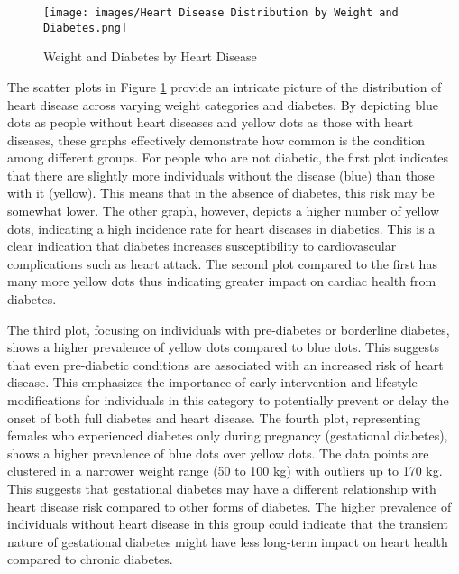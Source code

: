 \documentclass[12pt, a4paper,twoside]{report}
\numberwithin{equation}{chapter}
\begin{document}
 \begin{figure}[h]
     \centering
     \texttt{[image: images/Heart Disease Distribution by Weight and Diabetes.png]}
     \caption{Weight and Diabetes by Heart Disease}
     \label{fig:weight-diabetes}
 \end{figure}

The scatter plots in Figure \ref{fig:weight-diabetes} provide an intricate picture of the distribution of heart disease across varying weight categories and diabetes. By depicting blue dots as people without heart diseases and yellow dots as those with heart diseases, these graphs effectively demonstrate how common is the condition among different groups.
For people who are not diabetic, the first plot indicates that there are slightly more individuals without the disease (blue) than those with it (yellow). This means that in the absence of diabetes, this risk may be somewhat lower.
The other graph, however, depicts a higher number of yellow dots, indicating a high incidence rate for heart diseases in diabetics. This is a clear indication that diabetes increases susceptibility to cardiovascular complications such as heart attack. The second plot compared to the first has many more yellow dots thus indicating greater impact on cardiac health from diabetes.

The third plot, focusing on individuals with pre-diabetes or borderline diabetes, shows a higher prevalence of yellow dots compared to blue dots. This suggests that even pre-diabetic conditions are associated with an increased risk of heart disease. This emphasizes the importance of early intervention and lifestyle modifications for individuals in this category to potentially prevent or delay the onset of both full diabetes and heart disease.
The fourth plot, representing females who experienced diabetes only during pregnancy (gestational diabetes), shows a higher prevalence of blue dots over yellow dots. The data points are clustered in a narrower weight range (50 to 100 kg) with outliers up to 170 kg. This suggests that gestational diabetes may have a different relationship with heart disease risk compared to other forms of diabetes. The higher prevalence of individuals without heart disease in this group could indicate that the transient nature of gestational diabetes might have less long-term impact on heart health compared to chronic diabetes.
\end{document}
